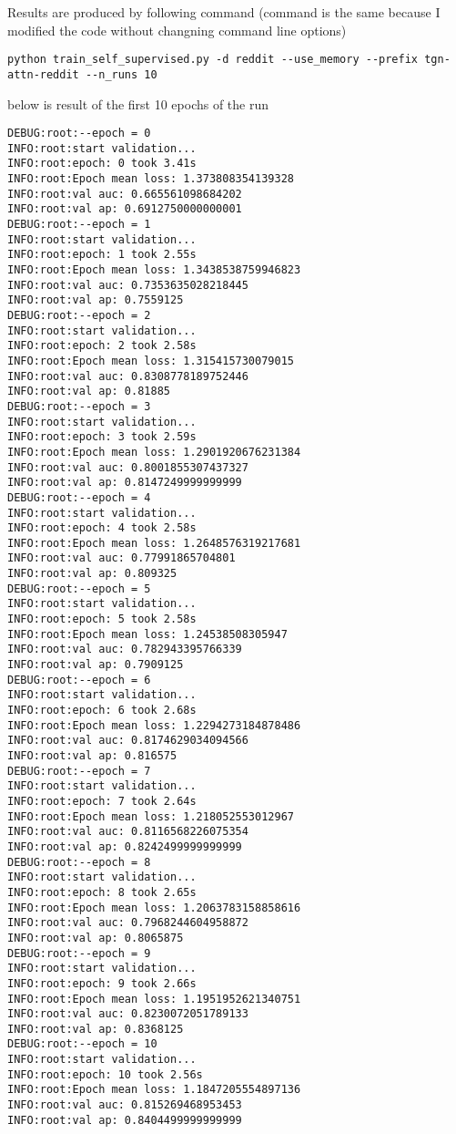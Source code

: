 \documentclass[11pt]{article}
\begin{document}
Results are produced by following command (command is the same because I modified the code without changning command line options)
\begin{verbatim}
python train_self_supervised.py -d reddit --use_memory --prefix tgn-attn-reddit --n_runs 10
\end{verbatim}

below is result of the first 10 epochs of the run
\begin{verbatim}
DEBUG:root:--epoch = 0
INFO:root:start validation...
INFO:root:epoch: 0 took 3.41s
INFO:root:Epoch mean loss: 1.373808354139328
INFO:root:val auc: 0.665561098684202
INFO:root:val ap: 0.6912750000000001
DEBUG:root:--epoch = 1
INFO:root:start validation...
INFO:root:epoch: 1 took 2.55s
INFO:root:Epoch mean loss: 1.3438538759946823
INFO:root:val auc: 0.7353635028218445
INFO:root:val ap: 0.7559125
DEBUG:root:--epoch = 2
INFO:root:start validation...
INFO:root:epoch: 2 took 2.58s
INFO:root:Epoch mean loss: 1.315415730079015
INFO:root:val auc: 0.8308778189752446
INFO:root:val ap: 0.81885
DEBUG:root:--epoch = 3
INFO:root:start validation...
INFO:root:epoch: 3 took 2.59s
INFO:root:Epoch mean loss: 1.2901920676231384
INFO:root:val auc: 0.8001855307437327
INFO:root:val ap: 0.8147249999999999
DEBUG:root:--epoch = 4
INFO:root:start validation...
INFO:root:epoch: 4 took 2.58s
INFO:root:Epoch mean loss: 1.2648576319217681
INFO:root:val auc: 0.77991865704801
INFO:root:val ap: 0.809325
DEBUG:root:--epoch = 5
INFO:root:start validation...
INFO:root:epoch: 5 took 2.58s
INFO:root:Epoch mean loss: 1.24538508305947
INFO:root:val auc: 0.782943395766339
INFO:root:val ap: 0.7909125
DEBUG:root:--epoch = 6
INFO:root:start validation...
INFO:root:epoch: 6 took 2.68s
INFO:root:Epoch mean loss: 1.2294273184878486
INFO:root:val auc: 0.8174629034094566
INFO:root:val ap: 0.816575
DEBUG:root:--epoch = 7
INFO:root:start validation...
INFO:root:epoch: 7 took 2.64s
INFO:root:Epoch mean loss: 1.218052553012967
INFO:root:val auc: 0.8116568226075354
INFO:root:val ap: 0.8242499999999999
DEBUG:root:--epoch = 8
INFO:root:start validation...
INFO:root:epoch: 8 took 2.65s
INFO:root:Epoch mean loss: 1.2063783158858616
INFO:root:val auc: 0.7968244604958872
INFO:root:val ap: 0.8065875
DEBUG:root:--epoch = 9
INFO:root:start validation...
INFO:root:epoch: 9 took 2.66s
INFO:root:Epoch mean loss: 1.1951952621340751
INFO:root:val auc: 0.8230072051789133
INFO:root:val ap: 0.8368125
DEBUG:root:--epoch = 10
INFO:root:start validation...
INFO:root:epoch: 10 took 2.56s
INFO:root:Epoch mean loss: 1.1847205554897136
INFO:root:val auc: 0.815269468953453
INFO:root:val ap: 0.8404499999999999
\end{verbatim}
\end{document}

